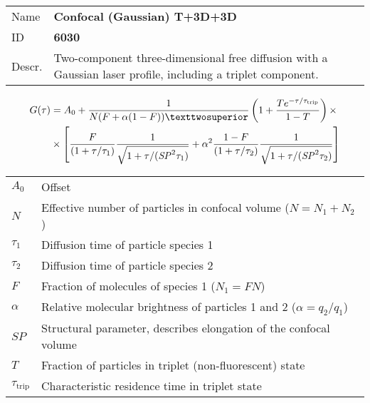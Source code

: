 \noindent \begin{tabular}{lp{}}
Name & \textbf{Confocal (Gaussian) T+3D+3D} \\ 
ID & \textbf{6030} \\ 
Descr. &  Two-component three-dimensional free diffusion with a Gaussian laser profile, including a triplet component\cite{Elson1974, Aragon1976, Palmer1987, Thomps:bookFCS2002}. \\ 
\end{tabular}
\begin{align}
G(\tau) &= A_0 + \frac{1}{N (F + \alpha (1-F))²}  \left(1 + \frac{T e^{-\tau/\tau_\mathrm{trip}}}{1-T}  \right)  \times \\
\notag &\times  \left[ \frac{F}{(1+\tau/\tau_1)}  \frac{1}{\sqrt{1+\tau/(\mathit{SP}^2 \tau_1)}} + \alpha^2 \frac{1-F}{ (1+\tau/\tau_2) }  \frac{1}{\sqrt{1+\tau/(\mathit{SP}^2 \tau_2)}} \right]
\end{align} 
\begin{center}
\begin{tabular}{ll}
$A_0$ & Offset \\ 
$N$ & Effective number of particles in confocal volume ($N = N_1+N_2$) \\ 
$\tau_1$ &  Diffusion time of particle species 1 \\ 
$\tau_2$ &  Diffusion time of particle species 2 \\ 
$F$ & Fraction of molecules of species 1 ($N_1 = F N$) \\
$\alpha$ & Relative molecular brightness of particles 1 and 2 ($ \alpha = q_2/q_1$) \\
$\mathit{SP}$ & Structural parameter, describes elongation of the confocal volume \\
$T$ &  Fraction of particles in triplet (non-fluorescent) state\\ 
$\tau_\mathrm{trip}$ &  Characteristic residence time in triplet state \\ 
\end{tabular}
\end{center}
\vspace{2em}



